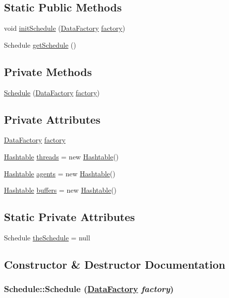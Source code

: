 \subsection*{Static Public Methods}
\begin{CompactItemize}
\item 
void \hyperlink{classSchedule_d0}{init\-Schedule} (\hyperlink{interfaceDataFactory}{Data\-Factory} \hyperlink{classSchedule_o0}{factory})
\item 
Schedule \hyperlink{classSchedule_d1}{get\-Schedule} ()
\end{CompactItemize}
\subsection*{Private Methods}
\begin{CompactItemize}
\item 
\hyperlink{classSchedule_c0}{Schedule} (\hyperlink{interfaceDataFactory}{Data\-Factory} \hyperlink{classSchedule_o0}{factory})
\end{CompactItemize}
\subsection*{Private Attributes}
\begin{CompactItemize}
\item 
\hyperlink{interfaceDataFactory}{Data\-Factory} \hyperlink{classSchedule_o0}{factory}
\item 
\hyperlink{classHashtable}{Hashtable} \hyperlink{classSchedule_o1}{threads} = new \hyperlink{classHashtable}{Hashtable}()
\item 
\hyperlink{classHashtable}{Hashtable} \hyperlink{classSchedule_o2}{agents} = new \hyperlink{classHashtable}{Hashtable}()
\item 
\hyperlink{classHashtable}{Hashtable} \hyperlink{classSchedule_o3}{buffers} = new \hyperlink{classHashtable}{Hashtable}()
\end{CompactItemize}
\subsection*{Static Private Attributes}
\begin{CompactItemize}
\item 
Schedule \hyperlink{classSchedule_r0}{the\-Schedule} = null
\end{CompactItemize}


\subsection{Constructor \& Destructor Documentation}
\hypertarget{classSchedule_c0}{
\subsubsection[Schedule]{\setlength{\rightskip}{0pt plus 5cm}Schedule::Schedule (\hyperlink{interfaceDataFactory}{Data\-Factory} {\em factory})}}
\label{classSchedule_c0}




